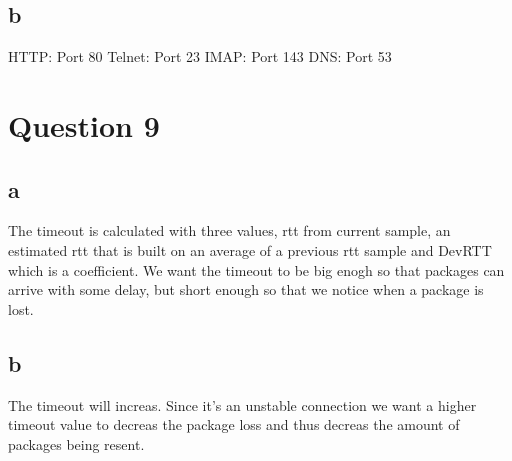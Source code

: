 \documentclass[oneside,a4paper,10pt]{report}
\begin{document}
\subsection{b}
HTTP: Port 80 Telnet: Port 23 IMAP: Port 143 DNS: Port 53

\section{Question 9}
\subsection{a}
The timeout is calculated with three values, rtt from  current sample, an estimated rtt that is built on an average of a previous rtt sample and DevRTT which is a coefficient.
We want the timeout to be big enogh so that packages can arrive with some delay, but short enough so that we notice when a package is lost.
\subsection{b}
The timeout will increas. Since it's an unstable connection we want a higher timeout value to decreas the package loss and thus decreas the amount of packages being resent.
\end{document}

